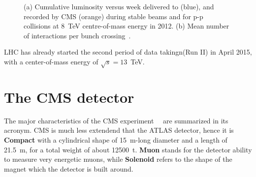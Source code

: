 \begin{figure}[hbt]
  \begin{center}
    \caption{(a) Cumulative luminosity versus week delivered to (blue), and recorded by CMS (orange) 
             during stable beams and for p-p collisions at 8~TeV centre-of-mass energy in 2012.
             (b) Mean number of interactions per bunch crossing~\cite{LumiPublic}.} 
    \label{fig:LHClumiPU}
  \end{center}
\end{figure}

LHC has already started the second period of data takingn(Run II) in April 2015, 
with a center-of-mass energy of $\sqrt{s}=13$~TeV.

\section{The CMS detector}
\label{sec:CMS}

The major characteristics of the CMS experiment~\cite{Chatrchyan:2008aa}~\cite{Bayatian:2006zz}
are summarized in its acronym. CMS is much less extendend that the ATLAS detector, 
hence it is \textbf{Compact} with a cylindrical shape of 15~\si{m}-long diameter and a length of 21.5~\si{m},
for a total weight of about 12500~\si{t}. \textbf{Muon} stands for the detector 
ability to measure very energetic muons, while \textbf{Solenoid} refers
to the shape of the magnet which the detector is built around.


